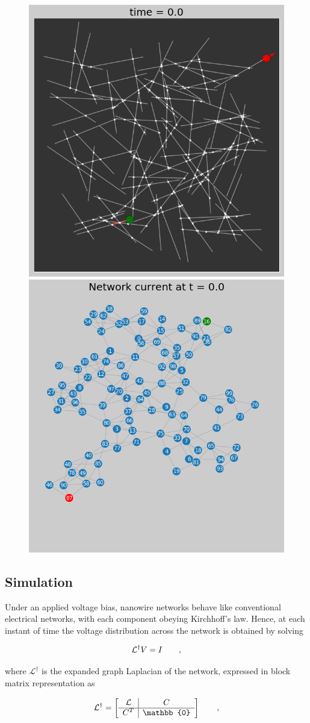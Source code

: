 \documentclass[fleqn,10pt,  reprint, amsmath,amssymb,aps, floatfix]{wlscirep}
\begin{document}
\begin{figure}[h]
	\centering
	\includegraphics[width=0.45\linewidth]{figure/mpl_plot}
	\includegraphics[width=0.45\linewidth]{figure/graph_plot}
	\caption{}
	\label{fig:nws}
\end{figure}

\subsection*{\label{sec:level2} Simulation}
Under an applied voltage bias, nanowire networks behave like conventional electrical networks, with each component obeying Kirchhoff's law. Hence, at each instant of time the voltage distribution across the network is obtained by solving \cite{Dorfler2018}

\begin{equation}
{\cal L}^\dagger V = I \qquad ,
\end{equation}

where $\mathcal{L}^\dagger$ is the expanded graph Laplacian of the network, expressed in block matrix representation as 

\begin{equation}
	\cal L^\dagger = 
	\left[
	\begin{array}{c|c}
	\cal L&  C\\ 
	\hline
	C^T & \mathbb{0}  
	\end{array}
	\right] \qquad ,
\end{equation}
\end{document}
